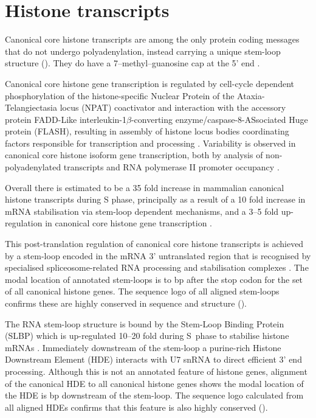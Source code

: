 \section{Histone transcripts}

  Canonical core histone transcripts are among the only protein coding messages
  that do not undergo polyadenylation,
  instead carrying a unique stem-loop structure ().
  They do have a 7--methyl--guanosine cap at the 5' end \citep{MarzluffNatRevGen2008}.

  Canonical core histone gene transcription is regulated
  by cell-cycle dependent phosphorylation of the histone-specific 
  Nuclear Protein of the Ataxia-Telangiectasia locus (NPAT) coactivator
  and interaction with the accessory protein 
  FADD-Like interleukin-1$\beta$-converting enzyme/caspase-8-ASsociated Huge protein (FLASH),
  resulting in assembly of histone locus bodies
  coordinating factors responsible for transcription and processing
  \citep{MarzluffNatRevGen2008,RattrayMueller2012,Hoefig2014}.
  Variability is observed in canonical core histone isoform gene transcription,
  both by analysis of non-polyadenylated transcripts \citep{YangGenomeBiol2011}
  and RNA polymerase II promoter occupancy \citep{Ederveen2011}.

  Overall there is estimated to be a 35 fold increase in mammalian
  canonical histone transcripts during S phase,
  principally as a result of a 10 fold increase in mRNA stabilisation
  via stem-loop dependent mechanisms,
  and a 3--5 fold up-regulation in canonical core histone gene transcription \citep{HarrisMCB1991}.

  This post-translation regulation of canonical core histone transcripts
  is achieved by a stem-loop encoded in the mRNA 3' untranslated region
  that is recognised by specialised spliceosome-related RNA
  processing and stabilisation complexes \citep{stem-loop-structure}.
  The modal location of annotated stem-loops is \StemLoopStart{} to \StemLoopEnd{} bp after the stop codon
  for the set of all canonical histone genes.
  The sequence logo of all aligned stem-loops
  confirms these are highly conserved in sequence and structure ().

  The RNA stem-loop structure is bound by the Stem-Loop Binding Protein (SLBP)
  which is up-regulated 10--20 fold during S~phase to stabilise
  histone mRNAs \citep{SLBP-regulation}.
  Immediately downstream of the stem-loop a purine-rich Histone Downstream Element (HDE)
  interacts with U7 snRNA to direct efficient 3' end processing.
  Although this is not an annotated feature of histone genes,
  alignment of the canonical HDE \citep{HDE-sequence} to all canonical histone genes
  shows the modal location of the HDE is 
  \HDEsDistanceFromStemLoop{} bp downstream of the stem-loop.
  The sequence logo calculated from all aligned HDEs 
  confirms that this feature is also highly conserved ().

